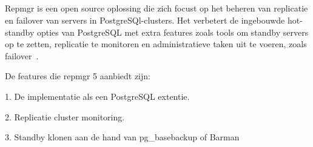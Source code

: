 \subsection{}
\label{subsec:Replication Manager (repmgr)}

Repmgr is een open source oplossing die zich focust op het beheren van replicatie en failover van servers in PostgreSQl-clusters. Het verbetert de ingebouwde hot-standby opties van PostgreSQL met extra features zoals tools om standby servers op te zetten, replicatie te monitoren en administratieve taken uit te voeren, zoals failover~\autocite{2021a}. %

De features die repmgr 5 aanbiedt zijn:

1. De implementatie als een PostgreSQL extentie.


2. Replicatie cluster monitoring.


3. Standby klonen aan de hand van pg\_basebackup of Barman

